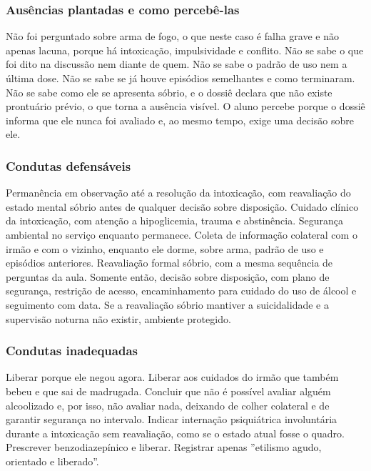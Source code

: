 \subsubsection*{Ausências plantadas e como percebê-las}

Não foi perguntado sobre arma de fogo, o que neste caso é falha grave e não apenas lacuna, porque há intoxicação, impulsividade e conflito. Não se sabe o que foi dito na discussão nem diante de quem. Não se sabe o padrão de uso nem a última dose. Não se sabe se já houve episódios semelhantes e como terminaram. Não se sabe como ele se apresenta sóbrio, e o dossiê declara que não existe prontuário prévio, o que torna a ausência visível. O aluno percebe porque o dossiê informa que ele nunca foi avaliado e, ao mesmo tempo, exige uma decisão sobre ele.

\subsubsection*{Condutas defensáveis}

Permanência em observação até a resolução da intoxicação, com reavaliação do estado mental sóbrio antes de qualquer decisão sobre disposição. Cuidado clínico da intoxicação, com atenção a hipoglicemia, trauma e abstinência. Segurança ambiental no serviço enquanto permanece. Coleta de informação colateral com o irmão e com o vizinho, enquanto ele dorme, sobre arma, padrão de uso e episódios anteriores. Reavaliação formal sóbrio, com a mesma sequência de perguntas da aula. Somente então, decisão sobre disposição, com plano de segurança, restrição de acesso, encaminhamento para cuidado do uso de álcool e seguimento com data. Se a reavaliação sóbrio mantiver a suicidalidade e a supervisão noturna não existir, ambiente protegido.

\subsubsection*{Condutas inadequadas}

Liberar porque ele negou agora. Liberar aos cuidados do irmão que também bebeu e que sai de madrugada. Concluir que não é possível avaliar alguém alcoolizado e, por isso, não avaliar nada, deixando de colher colateral e de garantir segurança no intervalo. Indicar internação psiquiátrica involuntária durante a intoxicação sem reavaliação, como se o estado atual fosse o quadro. Prescrever benzodiazepínico e liberar. Registrar apenas ''etilismo agudo, orientado e liberado''.

